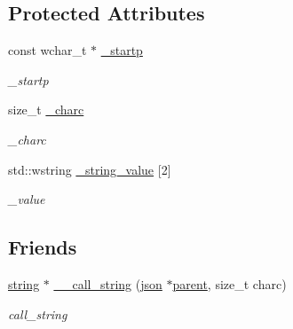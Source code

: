 \subsection*{Protected Attributes}
\begin{DoxyCompactItemize}
\item 
const wchar\+\_\+t $\ast$ \hyperlink{classformat_1_1string_a33f5dbb40ce3ad6361384c0b543fb216}{\+\_\+startp}\hypertarget{classformat_1_1string_a33f5dbb40ce3ad6361384c0b543fb216}{}\label{classformat_1_1string_a33f5dbb40ce3ad6361384c0b543fb216}

\begin{DoxyCompactList}\small\item\em \+\_\+startp \end{DoxyCompactList}\item 
size\+\_\+t \hyperlink{classformat_1_1string_a7622ab780e0a919908d314b173012f41}{\+\_\+charc}\hypertarget{classformat_1_1string_a7622ab780e0a919908d314b173012f41}{}\label{classformat_1_1string_a7622ab780e0a919908d314b173012f41}

\begin{DoxyCompactList}\small\item\em \+\_\+charc \end{DoxyCompactList}\item 
std\+::wstring \hyperlink{classformat_1_1string_ad953f26ee9500cbcd166df27ae7fb7a4}{\+\_\+string\+\_\+value} \mbox{[}2\mbox{]}\hypertarget{classformat_1_1string_ad953f26ee9500cbcd166df27ae7fb7a4}{}\label{classformat_1_1string_ad953f26ee9500cbcd166df27ae7fb7a4}

\begin{DoxyCompactList}\small\item\em \+\_\+value \end{DoxyCompactList}\end{DoxyCompactItemize}
\subsection*{Friends}
\begin{DoxyCompactItemize}
\item 
\hyperlink{classformat_1_1string}{string} $\ast$ \hyperlink{classformat_1_1string_ab6663097ece046a209a089cf9745efc4}{\+\_\+\+\_\+call\+\_\+string} (\hyperlink{classformat_1_1json}{json} $\ast$\hyperlink{classformat_1_1value_a86c03ec8810bfd0d60ec49095120040d}{parent}, size\+\_\+t charc)
\begin{DoxyCompactList}\small\item\em call\+\_\+string \end{DoxyCompactList}\end{DoxyCompactItemize}
